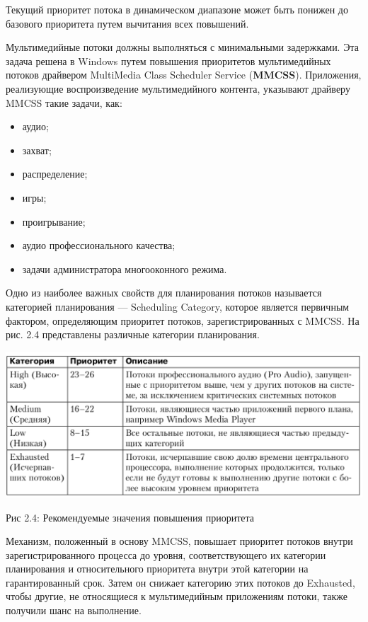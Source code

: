 \documentclass[12pt]{report}
\begin{document}
Текущий приоритет потока в динамическом диапазоне может быть понижен до базового приоритета путем вычитания всех повышений.

Мультимедийные потоки должны выполняться с минимальными задержками. Эта задача решена в Windows путем повышения приоритетов мультимедийных потоков драйвером MultiMedia Class Scheduler Service (\textbf{MMCSS}). Приложения, реализующие воспроизведение мультимедийного контента, указывают драйверу MMCSS такие задачи, как:
\begin{itemize}
\item аудио;
\item захват;
\item распределение;
\item игры;
\item проигрывание;
\item аудио профессионального качества;
\item задачи администратора многооконного режима.
\end{itemize}

Одно из наиболее важных свойств для планирования потоков называется категорией планирования — Scheduling Category, которое является первичным фактором, определяющим приоритет потоков, зарегистрированных с MMCSS. На рис. 2.4 представлены различные категории планирования.

\begin{center}
		\includegraphics[scale=0.6]{pics/MMCSS.png}
		
			Рис 2.4: Рекомендуемые значения повышения приоритета
\end{center}

Механизм, положенный в основу MMCSS, повышает приоритет потоков внутри зарегистрированного процесса до уровня, соответствующего их категории планирования и относительного приоритета внутри этой категории на гарантированный срок. Затем он снижает категорию этих потоков до Exhausted, чтобы другие, не относящиеся к мультимедийным приложениям потоки, также получили шанс на выполнение.
\end{document}
